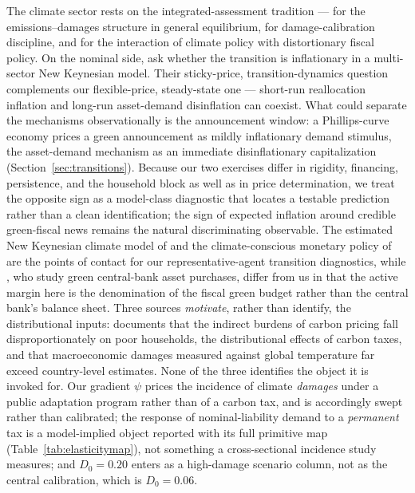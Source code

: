 \documentclass[12pt]{article}
\begin{document}
The climate sector rests on the integrated-assessment tradition ---
\citet{golosov2014} for the emissions--damages structure in general
equilibrium, \citet{nordhaus2017} for damage-calibration discipline, and
\citet{barrage2020} for the interaction of climate policy with distortionary
fiscal policy. On the nominal side, \citet{delnegro2023green} ask whether the
transition is inflationary in a multi-sector New Keynesian model. Their
sticky-price, transition-dynamics question complements our flexible-price,
steady-state one --- short-run reallocation inflation and long-run
asset-demand disinflation can coexist. What could separate the mechanisms
observationally is the announcement window: a Phillips-curve economy prices a
green announcement as mildly inflationary demand stimulus, the asset-demand
mechanism as an immediate disinflationary capitalization
(Section~\ref{sec:transitions}). Because our two exercises differ in
rigidity, financing, persistence, and the household block as well as in price
determination, we treat the opposite sign as a model-class diagnostic that
locates a testable prediction rather than a clean identification; the sign of
expected inflation around credible green-fiscal news remains the natural
discriminating observable. The estimated New Keynesian climate model of
\citet{sahucsmetsvermandel2024} and the climate-conscious monetary policy of
\citet{nakovthomas2026} are the points of contact for our
representative-agent transition diagnostics, while
\citet{ferrarinispilandi2023}, who study green central-bank asset purchases,
differ from us in that the active margin here is the denomination of the
fiscal green budget rather than the central bank's balance sheet. Three
sources \emph{motivate}, rather than identify, the distributional inputs:
\citet{kanzig2023carbon} documents that the indirect burdens of carbon pricing
fall disproportionately on poor households, \citet{fried2018} the
distributional effects of carbon taxes, and \citet{bilalkanzig2024} that
macroeconomic damages measured against global temperature far exceed
country-level estimates. None of the three identifies the object it is
invoked for. Our gradient $\psi$ prices the incidence of climate
\emph{damages} under a public adaptation program rather than of a carbon tax,
and is accordingly swept rather than calibrated; the response of
nominal-liability demand to a \emph{permanent} tax is a model-implied object
reported with its full primitive map (Table~\ref{tab:elasticitymap}), not
something a cross-sectional incidence study measures; and $D_0=0.20$ enters
as a high-damage scenario column, not as the central calibration, which is
$D_0=0.06$.
\end{document}
